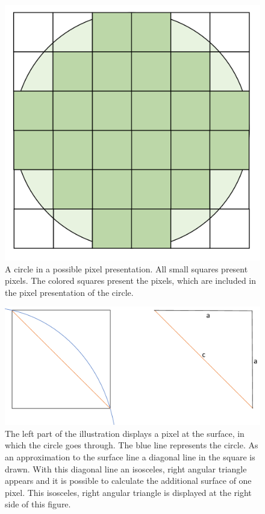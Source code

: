 \begin{figure}[ht]
	\center
	\includegraphics[scale=0.15]{figures/PixelCircleSquare.png}
	\caption[A circle in a possible pixel presentation]{A circle in a possible pixel presentation. All small squares present pixels. The colored squares present the pixels, which are included in the pixel presentation of the circle.}
	\label{img:CircleSquarePixels}
\end{figure}

\begin{figure}[ht]
\center
	\includegraphics[scale=0.3]{figures/SurfaceApproximationSQRT2.png}
	\caption[An approximation to the surface of a sphere with a pixel and a diagonal]{The left part of the illustration displays a pixel at the surface, in which the circle goes through. The blue line represents the circle. As an approximation to the surface line a diagonal line in the square is drawn. With this diagonal line an isosceles, right angular triangle appears and it is possible to calculate the additional surface of one pixel. This isosceles, right angular triangle is displayed at the right side of this figure.}
	\label{img:ApproximationSQRT2}
\end{figure}


